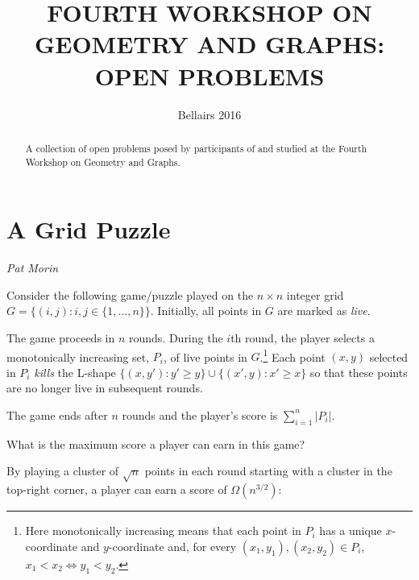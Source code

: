 \documentclass{patmorin}
\title{\MakeUppercase{Fourth Workshop on Geometry and Graphs:
       Open Problems}}
\author{Bellairs 2016}
\begin{document}
\begin{titlepage}
\maketitle

\begin{abstract}
  A collection of open problems posed by participants of and studied at
  the Fourth Workshop on Geometry and Graphs.
\end{abstract}
\end{titlepage}

\tableofcontents
\newpage



\section{A Grid Puzzle}

\noindent\emph{Pat Morin}

Consider the following game/puzzle played on the $n\times n$ integer
grid $G=\{(i,j):i,j\in\{1,\ldots,n\}\}$.  Initially, all points in $G$
are marked as \emph{live}.  

The game proceeds in $n$
rounds. During the $i$th round, the player selects a monotonically
increasing set, $P_i$, of live points in $G$.\footnote{Here monotonically
increasing means that each point in $P_i$ has a unique $x$-coordinate
and $y$-coordinate and, for every $(x_1,y_1),(x_2,y_2)\in P_i$, $x_1 <
x_2\Leftrightarrow y_1<y_2$.}  Each point $(x,y)$ selected in $P_i$
\emph{kills} the L-shape $\{(x,y'): y'\ge y\}\cup\{(x',y):x'\ge x\}$ so 
that these points are no longer live in subsequent rounds. 

The game ends after $n$ rounds and the player's score is $\sum_{i=1}^n |P_i|$.

\begin{op}
   What is the maximum score a player can earn in this game?
\end{op}

By playing a cluster of $\sqrt{n}$ points in each round starting with a cluster
in the top-right corner, a player can earn a score of $\Omega(n^{3/2})$: 
\end{document}
